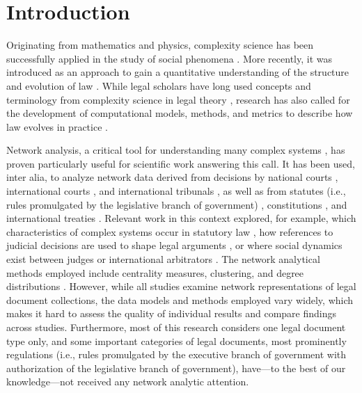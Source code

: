 \section{Introduction}
\label{sec:introduction}

Originating from mathematics and physics, complexity science has been successfully applied in the study of social phenomena \cite{mitchell2009,miller2009}. 
More recently, it was introduced as an approach to gain a quantitative understanding of the structure and evolution of law \cite{ruhl2017}. 
While legal scholars have long used concepts and terminology from complexity science in legal theory \cite{murray2018,ruhl1995,scott1993},
research has also called for the development of computational models, methods, and metrics to describe how law evolves in practice \cite{ruhl2015}.

Network analysis, a critical tool for understanding many complex systems \cite{amaral2004,albert2002,watts1998}, has proven particularly useful for scientific work answering this call.
It has been used, inter alia, to analyze network data derived from decisions by national courts \cite{coupette2019,winkels2019,black2013,lupu2013,bommarito2011,cross2010,fowler2007},
international courts \cite{olsen2020,alschner2018,larsson2017,tarissan2016a,panagis2015,pelc2014,lupu2012},
and international tribunals \cite{charlotin2017, langford2017},
as well as from statutes (i.e., rules promulgated by the legislative branch of government) \cite{katz2020,coupette2019a,boulet2018,koniaris2018,li2015,katz2014,bommarito2010},
constitutions \cite{lee2019,rutherford2018,rockmore2017},
and international treaties \cite{boulet2019,alschner2016,kim2013,kinne2013,saban2010}.
Relevant work in this context explored, for example, which characteristics of complex systems occur in statutory law \cite{katz2020,koniaris2018,li2015}, how references to judicial decisions are used to shape legal arguments \cite{larsson2017,black2013,lupu2013}, or where social dynamics exist between judges or international arbitrators \cite{katz2010,langford2017}.
The network analytical methods employed include centrality measures, clustering, and degree distributions \cite{katz2020,coupette2019,winkels2019,lee2019,alschner2016}.
However, while all studies examine network representations of legal document collections, the data models and methods employed vary widely, which makes it hard to assess the quality of individual results and compare findings across studies.
Furthermore, most of this research considers one legal document type only, 
and some important categories of legal documents, most prominently regulations (i.e., rules promulgated by the executive branch of government with authorization of the legislative branch of government), have---to the best of our knowledge---not received any network analytic attention.

